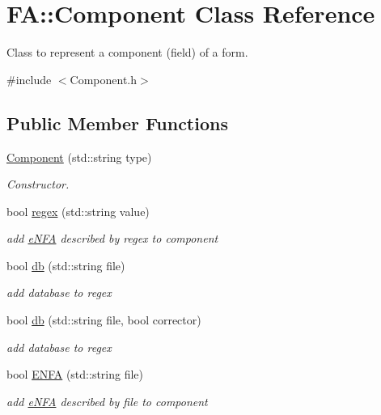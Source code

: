 \hypertarget{classFA_1_1Component}{\section{F\-A\-:\-:Component Class Reference}
\label{classFA_1_1Component}
}


Class to represent a component (field) of a form.  




{\ttfamily \#include $<$Component.\-h$>$}

\subsection*{Public Member Functions}
\begin{DoxyCompactItemize}
\item 
\hyperlink{classFA_1_1Component_a34aa58bbe772f397e019d090bd4f4d1d}{Component} (std\-::string type)
\begin{DoxyCompactList}\small\item\em Constructor. \end{DoxyCompactList}\item 
bool \hyperlink{classFA_1_1Component_a0bf03aa2ba0850511a4352396db4a61f}{regex} (std\-::string value)
\begin{DoxyCompactList}\small\item\em add \hyperlink{classFA_1_1eNFA}{e\-N\-F\-A} described by regex to component \end{DoxyCompactList}\item 
bool \hyperlink{classFA_1_1Component_a6c53702203b59f41126b829d680662e4}{db} (std\-::string file)
\begin{DoxyCompactList}\small\item\em add database to regex \end{DoxyCompactList}\item 
bool \hyperlink{classFA_1_1Component_a9a70d686864f2f0f15bc13de4237c9cd}{db} (std\-::string file, bool corrector)
\begin{DoxyCompactList}\small\item\em add database to regex \end{DoxyCompactList}\item 
bool \hyperlink{classFA_1_1Component_adbc44ec06fb79de8375e7cab47792cc7}{E\-N\-F\-A} (std\-::string file)
\begin{DoxyCompactList}\small\item\em add \hyperlink{classFA_1_1eNFA}{e\-N\-F\-A} described by file to component \end{DoxyCompactList}\item 

\end{DoxyCompactItemize}
